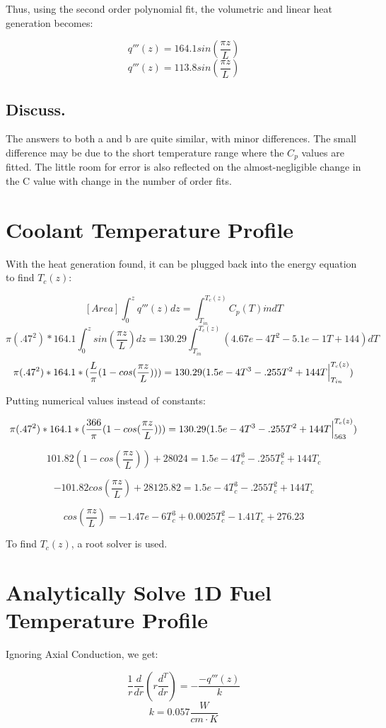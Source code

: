 \documentclass[12pt,letterpaper]{article}
\begin{document}
Thus, using the second order polynomial fit, the volumetric
and linear heat generation becomes:

\[q'''(z) = 164.1 sin(\frac{\pi z}{L})\]
\[q'''(z) = 113.8 sin(\frac{\pi z}{L})\]


\subsection*{Discuss.}
The answers to both a and b are quite similar, with minor differences.
The small difference may be due to the short temperature range where
the $C_p$ values are fitted. The little room for error is also reflected
on the almost-negligible change in the C value with change in the number of 
order fits. 




\section*{Coolant Temperature Profile}
With the heat generation found, it can be plugged back
into the energy equation to find $T_c(z)$:

\[[Area] \int^{z}_0 q'''(z) dz = \int^{T_c (z)}_{T_{in}} C_p(T) \dot{m} dT\]
\[\pi (.47^2) * 164.1 \int^{z}_0 sin(\frac{\pi z}{L})  dz =
    130.29 \int^{T_c (z)}_{T_{in}} (4.67e-4T^2 -5.1e-1T + 144)  dT\]
\[\pi (.47^2) * 164.1 * (\frac{L}{\pi} (1-cos(\frac{\pi z}{L}))) =
    130.29 (1.5e-4T^3 - .255T^2 + 144 T \Big{|}^{T_c (z)}_{T_{in}})\]

Putting numerical values instead of constants:

\[\pi (.47^2) * 164.1 * (\frac{366}{\pi} (1-cos(\frac{\pi z}{L}))) =
    130.29 (1.5e-4T^3 - .255T^2 + 144 T \Big{|}^{T_c (z)}_{563})\]

\[101.82 (1- cos(\frac{\pi z}{L})) + 28024 = 1.5e-4T_c^3 - .255T_c^2 + 144 T_c \]

\[-101.82 cos(\frac{\pi z}{L}) + 28125.82 = 1.5e-4T_c^3 - .255T_c^2 + 144 T_c \]

\[ cos(\frac{\pi z}{L}) = -1.47e-6T_c^3 + 0.0025T_c^2 -1.41 T_c + 276.23\]

To find $T_c(z)$, a root solver is used.



\section*{Analytically Solve 1D Fuel Temperature Profile}
Ignoring Axial Conduction, we get:

\[\frac{1}{r} \frac{d}{dr} (r \frac{d^T}{dr}) = -\frac{-q'''(z)}{k}\]
\[k = 0.057 \frac{W}{cm\cdot K}\]
\end{document}
